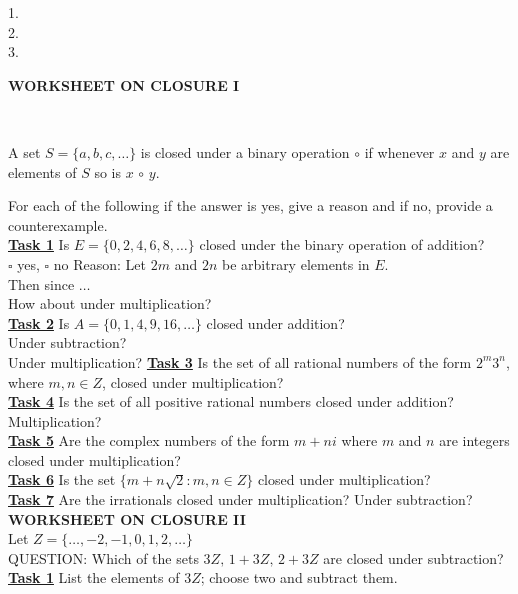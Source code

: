 \documentclass[12pt, fleqn, oneside]{book}
\begin{document}
\begin{minipage}{3in}
1.\\[.3in]
2.\\[.3in]
3.\\
\end{minipage}
%
%
%

\clearpage
%
%
%
{\large \bf WORKSHEET ON CLOSURE I}\\[.25in]
\

\qquad A set $S=\{a,b,c,\dots\}$ is closed under a binary operation $\circ$ if whenever $x$ and $y$ are elements of $S$ so is $x\,\circ\,y$.

\qquad For each of the following if the answer is yes, give a reason and if no, provide a counterexample.\\[.25in]
\underline{\bf{Task 1}} Is $E=\{0,2,4,6,8,\dots\}$ closed under the binary operation of addition?\\ [.2in]
{\Huge $\square$} yes, {\Huge$\square$} no \qquad Reason:  Let $2m$ and $2n$ be arbitrary elements in $E$.\\[.15in]
Then since $\dots$\\[1.25in]
How about under multiplication?\\[1.25in]
\underline{\bf{Task 2}} Is $A=\{0,1,4,9,16,\dots\}$ closed under addition?\\[1.25in]
Under subtraction?\\[1.25in]
Under multiplication?%
%
\clearpage%
%
\underline{\bf{Task 3}} Is the set of all rational numbers of the form $2^m3^n$, where $m,n \in Z$, closed under multiplication?\\[1.5in]
\underline{\bf{Task 4}} Is the set of all positive rational numbers closed under addition?  Multiplication?\\[1.5in]
\underline{\bf{Task 5}} Are the complex numbers of the form $m+ni$ where $m$ and $n$ are integers closed under multiplication?\\[1.5in]
\underline{\bf{Task 6}} Is the set $\{m+n\sqrt{2}: m, n\in Z\}$ closed under multiplication?\\[1.5in]
\underline{\bf{Task 7}} Are the irrationals closed under multiplication? Under subtraction?
%
%
%
\clearpage%
%
%
%
{\large \bf WORKSHEET ON CLOSURE II}\\[.25in]
Let $Z=\{\dots, -2, -1, 0, 1, 2, \dots\}$\\
QUESTION: Which of the sets $3Z,\, 1+3Z,\,2+3Z$ are closed under subtraction?\\[.25in]
\underline{\bf{Task 1}} List the elements of $3Z$; choose two and subtract them.\\[1.25in]
\end{document}
